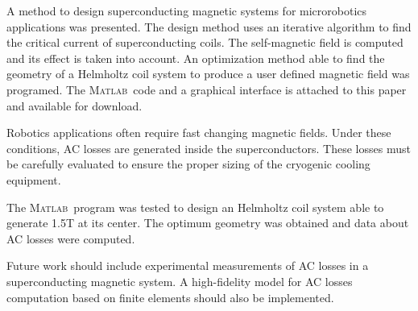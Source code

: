 \documentclass{ws-jmrr}
\newcommand{\MATLAB}{\textsc{Matlab}}
\begin{document}
\begin{multicols}{2}
A method to design superconducting magnetic systems for microrobotics applications was presented. The design method uses an iterative algorithm to find the critical current of superconducting coils. The self-magnetic field is computed and its effect is taken into account. An optimization method able to find the geometry of a Helmholtz coil system to produce a user defined magnetic field was programed. The \MATLAB ~code and a graphical interface is attached to this paper and available for download.\par
Robotics applications often require fast changing magnetic fields. Under these conditions, AC losses are generated inside the superconductors. These losses must be carefully evaluated to ensure the proper sizing of the cryogenic cooling equipment.\par
The \MATLAB ~program was tested to design an Helmholtz coil system able to generate 1.5T at its center. The optimum geometry was obtained and data about AC losses were computed.\par
Future work should include experimental measurements of AC losses in a superconducting magnetic system. A high-fidelity model for AC losses computation based on finite elements should also be implemented.





\end{multicols} 
\end{document}
